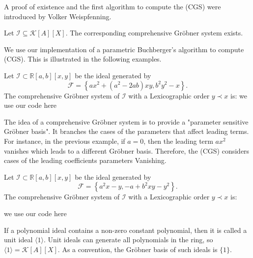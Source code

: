\documentclass[runningheads]{llncs}
\newcommand{\Rr}{\mathbb{R}}
\newcommand{\1}{\chi}
\newcommand{\Ff}{\mathcal{F}}
\newcommand{\Ii}{\mathcal{I}}
\begin{document}
A proof of existence and the first algorithm to compute the (CGS) were introduced by Volker Weispfenning.
\begin{theorem}
    Let $\mathcal{I}\subseteq\mathcal{K}[A][X].$ The corresponding comprehensive Gr{\"o}bner system exists.\cite{weispfenning}
\end{theorem}
We use our implementation of a parametric Buchberger's algorithm to compute (CGS). 
This is illustrated in the following examples.
\begin{example}
    Let $\Ii\subset \Rr[a,b][x,y]$ be the ideal generated by 
    $$\Ff=\left\{a x^2+\left(a^2-2 a b\right) x y, b^2 y^2-x\right\}.$$
    The comprehensive Gr{\"o}bner system of $\Ii$ with a Lexicographic order $y\prec x$ is:
    {\color{red} we use our code here}
\end{example}
The idea of a comprehensive Gr{\"o}bner system is to provide a "parameter sensitive Gr{\"o}bner basis".
It branches the cases of the parameters that affect leading terms. For instance, in the previous
example, if $a=0$, then the leading term $a x^2$ vanishes which leads to a different Gr{\"o}bner basis. Therefore,
the (CGS) considers cases of the leading coefficients parameters Vanishing.

\begin{example}
    Let $\mathcal{I}\subset \Rr[a,b][x,y]$ be the ideal generated by 
    $$\Ff=\left\{a^2 x-y,-a+b^2 x
    y-y^2\right\}.$$
    The comprehensive Gr{\"o}bner system of $\mathcal{I}$ with a Lexicographic order $y\prec x$ is:
    
    {\color{red} we use our code here}
\end{example}

\begin{remark}
    If a polynomial ideal contains a non-zero constant polynomial, then it is called a unit ideal $\langle 1\rangle$.
   Unit ideals can generate all polynomials in the ring, so $\langle 1\rangle=\mathcal{K}[A][X]$.
    As a convention, the Gr{\"o}bner basis of such ideals is $\{1\}$.
\end{remark}
   
\end{document}
